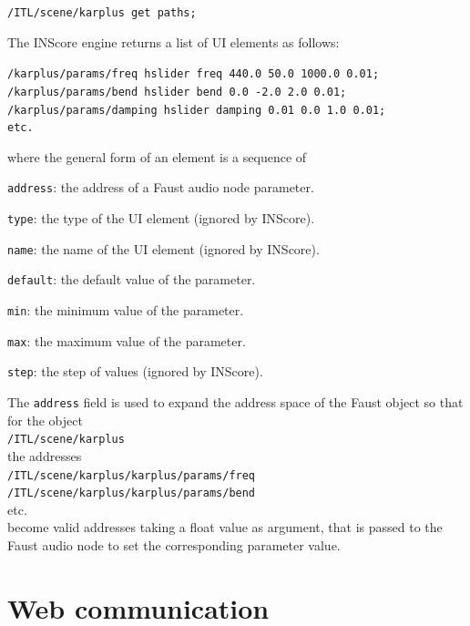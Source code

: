 \documentclass{article}
\newcommand{\ispace}	{\setlength\itemsep{0mm}}
\newcommand{\icode}[1]	{{\small \texttt{#1}}}
\newcommand{\code}[1]	{\vspace{-1em}\begin{center}\colorbox{mygrey}{\begin{minipage}[t]{0.98\columnwidth} {\scriptsize \texttt{#1}}\end{minipage}}\end{center}}
\begin{document}
\code{/ITL/scene/karplus get paths;}

The INScore engine returns a list of UI elements as follows:
\code{/karplus/params/freq hslider freq 440.0 50.0 1000.0 0.01;\\
/karplus/params/bend hslider bend 0.0 -2.0 2.0 0.01;\\
/karplus/params/damping hslider damping 0.01 0.0 1.0 0.01;\\
etc.}
where the general form of an element is a sequence of
\begin{description}
\ispace
\item[] \icode{address}: the address of a Faust audio node parameter.
\item[] \icode{type}: the type of the UI element (ignored by INScore).
\item[] \icode{name}: the name of the UI element (ignored by INScore).
\item[] \icode{default}: the default value of the parameter.
\item[] \icode{min}: the minimum value of the parameter.
\item[] \icode{max}: the maximum value of the parameter.
\item[] \icode{step}: the step of values (ignored by INScore).
\end{description}

The \icode{address} field is used to expand the address space of the Faust object so that for the object \\
\icode{/ITL/scene/karplus}\\
 the addresses\\
\icode{/ITL/scene/karplus/karplus/params/freq} \\
\icode{/ITL/scene/karplus/karplus/params/bend} \\
etc. \\
become valid addresses taking a float value as argument, that is passed to the Faust audio node to set the corresponding parameter value. 


\section{Web communication}\label{sec:comm}
\end{document}
